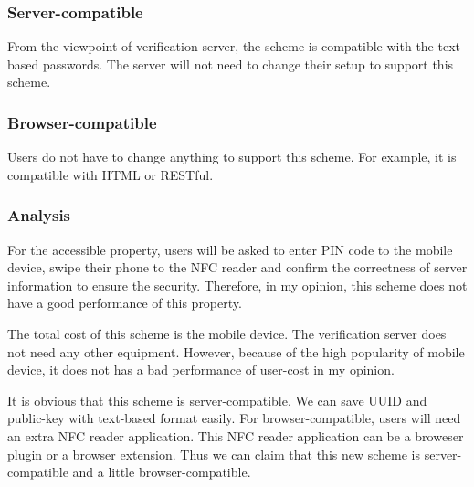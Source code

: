 \begin{CJK}{Bg5}{bsmi}
\subsubsection{Server-compatible}

From the viewpoint of verification server, the scheme is compatible with the text-based passwords. The server will not need to change their setup to support this scheme. 
\subsubsection{Browser-compatible}

Users do not have to change anything to support this scheme. For example, it is compatible with HTML or RESTful.

\subsubsection{Analysis}

For the accessible property, users will be asked to enter PIN code to the mobile device, swipe their phone to the NFC reader and confirm the correctness of server information to ensure the security. Therefore, in my opinion, this scheme does not have a good performance of this property.

The total cost of this scheme is the mobile device. The verification server does not need any other equipment. However, because of the high popularity of mobile device, it does not has a bad performance of user-cost in my opinion.

It is obvious that this scheme is server-compatible. We can save UUID and public-key with text-based format easily. For browser-compatible, users will need an extra NFC reader application. This NFC reader application can be a broweser plugin or a browser extension. Thus we can claim that this new scheme is server-compatible and a little browser-compatible.

\end{CJK}